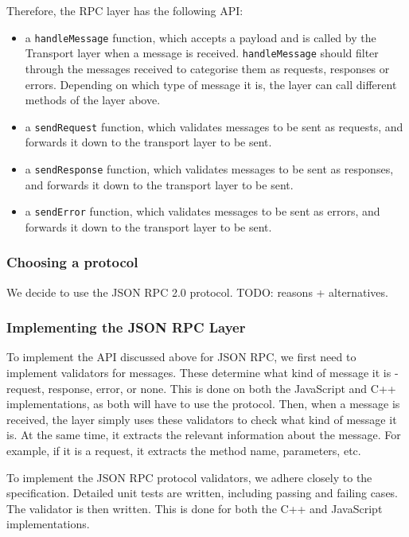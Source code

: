 Therefore, the RPC layer has the following API:
\begin{itemize}
	\item a \lstinline+handleMessage+ function, which accepts a payload and is called by the Transport layer when a message is received. \lstinline+handleMessage+ should filter through the messages received to categorise them as requests, responses or errors. Depending on which type of message it is, the layer can call different methods of the layer above.
	\item a \lstinline+sendRequest+ function, which validates messages to be sent as requests, and forwards it down to the transport layer to be sent.
	\item a \lstinline+sendResponse+ function, which validates messages to be sent as responses, and forwards it down to the transport layer to be sent.
	\item a \lstinline+sendError+ function, which validates messages to be sent as errors, and forwards it down to the transport layer to be sent.
\end{itemize}

\subsubsection{Choosing a protocol} %
\label{ssub:choosing_a_protocol}
We decide to use the JSON RPC 2.0 protocol. TODO: reasons + alternatives.

\subsubsection{Implementing the JSON RPC Layer} %
\label{ssub:implementing_the_jsonrpc_layer}
To implement the API discussed above for JSON RPC, we first need to implement validators for messages. These determine what kind of message it is - request, response, error, or none. This is done on both the JavaScript and C++ implementations, as both will have to use the protocol. Then, when a message is received, the layer simply uses these validators to check what kind of message it is. At the same time, it extracts the relevant information about the message. For example, if it is a request, it extracts the method name, parameters, etc. 

To implement the JSON RPC protocol validators, we adhere closely to the specification. Detailed unit tests are written, including passing and failing cases. The validator is then written. This is done for both the C++ and JavaScript implementations.

